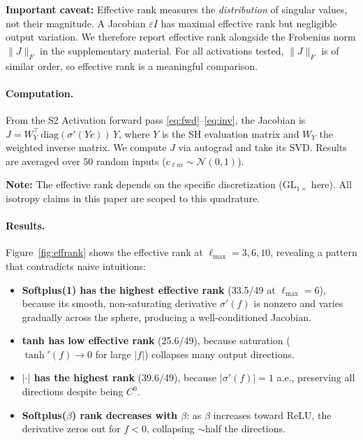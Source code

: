 \documentclass[10pt,twocolumn]{article}
\begin{document}
\textbf{Important caveat:} Effective rank measures the \emph{distribution} of singular
values, not their magnitude. A Jacobian $\varepsilon I$ has maximal effective rank but
negligible output variation. We therefore report effective rank alongside the Frobenius
norm $\|J\|_F$ in the supplementary material. For all activations tested,
$\|J\|_F$ is of similar order, so effective rank is a meaningful comparison.

\paragraph{Computation.}
From the S2 Activation forward pass \eqref{eq:fwd}--\eqref{eq:inv}, the Jacobian is
$J = W_Y^\top \,\mathrm{diag}(\sigma'(Y c))\, Y$, where $Y$ is the SH evaluation matrix
and $W_Y$ the weighted inverse matrix. We compute $J$ via autograd and take its SVD.
Results are averaged over 50 random inputs ($c_{\ell m} \sim \mathcal{N}(0,1)$).

\textbf{Note:} The effective rank depends on the specific discretization
(GL$_{1\times}$ here). All isotropy claims in this paper are scoped to this quadrature.

\paragraph{Results.}
Figure~\ref{fig:effrank} shows the effective rank at $\ell_{\max} = 3, 6, 10$, revealing
a pattern that contradicts naive intuitions:

\begin{itemize}
  \item \textbf{Softplus(1) has the highest effective rank} (33.5/49 at $\ell_{\max}{=}6$),
    because its smooth, non-saturating derivative $\sigma'(f)$ is nonzero and varies
    gradually across the sphere, producing a well-conditioned Jacobian.
  \item \textbf{tanh has low effective rank} (25.6/49), because saturation
    ($\tanh'(f) \to 0$ for large $|f|$) collapses many output directions.
  \item \textbf{$|\cdot|$ has the highest rank} (39.6/49), because
    $|\sigma'(f)| = 1$ a.e., preserving all directions despite being $C^0$.
  \item \textbf{Softplus($\beta$) rank decreases with $\beta$}: as $\beta$ increases
    toward ReLU, the derivative zeros out for $f < 0$, collapsing $\sim$half the
    directions.
\end{itemize}
\end{document}
